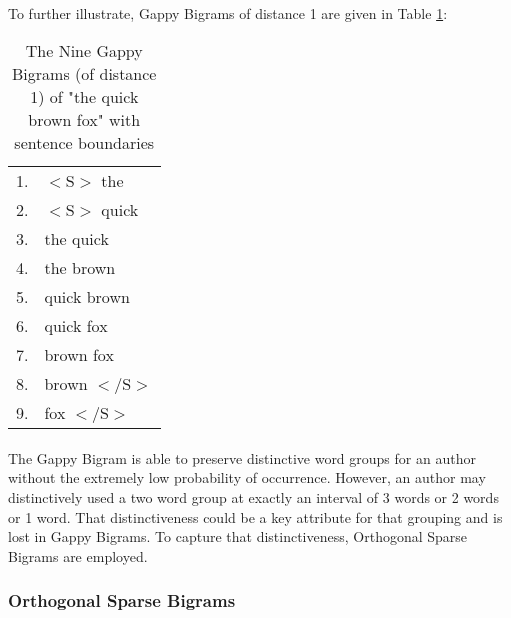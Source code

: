 		\paragraph{}To further illustrate, Gappy Bigrams of distance 1 are given in Table \ref{table:1gappybigrams}:
		
		\begin{center}
			\begin{table}[h]
				\begin{center}
					\begin{tabular}{ r l }
					1. & $<\text{S}>$ the\\
					2. & $<\text{S}>$ quick\\
					3. & the quick\\
					4. & the brown\\
					5. & quick brown\\
					6. & quick fox\\
					7. & brown fox\\
					8. & brown $<\text{/S}>$\\
					9. & fox $<\text{/S}>$\\
					\end{tabular}
					\caption{The Nine Gappy Bigrams (of distance 1) of "the quick brown fox" with sentence boundaries}
					\label{table:1gappybigrams}
				\end{center}
			\end{table}
		\end{center}

		\paragraph{}  The Gappy Bigram is able to preserve distinctive word groups for an author without the extremely low probability of occurrence.  However, an author may distinctively used a two word group at exactly an interval of 3 words or 2 words or 1 word.  That distinctiveness could be a key attribute for that grouping and is lost in Gappy Bigrams.  To capture that distinctiveness, Orthogonal Sparse Bigrams are employed.

	\subsubsection{Orthogonal Sparse Bigrams}
